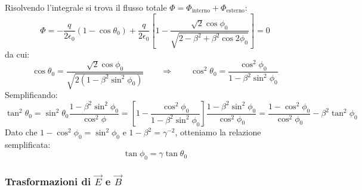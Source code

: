 \documentclass[]{article}
\begin{document}
Risolvendo l'integrale si trova il flusso totale $ \Phi = \Phi_{\text{interno}} + \Phi_{\text{esterno}} $:
\begin{equation}
	\Phi = -\frac{q}{2\epsilon_0} (1-\cos\theta_0) + \frac{q}{2\epsilon_0} \left[ 1 - \frac{\sqrt{2}\cos\phi_0}{\sqrt{2 - \beta^2 + \beta^2 \cos2\phi_0}} \right] = 0
	\label{eq:35}
\end{equation}
da cui:
\begin{equation}
	\cos\theta_0 = \frac{\sqrt{2}\cos\phi_0}{\sqrt{2(1 - \beta^2\sin^2\phi_0)}} \qquad\Longrightarrow\qquad \cos^2\theta_0 = \frac{\cos^2\phi_0}{1 - \beta^2\sin^2\phi_0}
	\label{eq:36}
\end{equation}
Semplificando:
\begin{equation}
	\tan^2\theta_0 = \sin^2\theta_0 \frac{1 - \beta^2\sin^2\phi_0}{\cos^2\phi} = \left[1 - \frac{\cos^2\phi_0}{1 - \beta^2\sin^2\phi_0} \right] \frac{1 - \beta^2\sin^2\phi_0}{\cos^2\phi_0} = \frac{1 - \cos^2\phi_0}{\cos^2\phi_0} - \beta^2\tan^2\phi_0
	\label{eq:37}
\end{equation}
Dato che $ 1 - \cos^2\phi_0 = \sin^2\phi_0 $ e $ 1 - \beta^2 = \gamma^{-2} $, otteniamo la relazione semplificata:
\begin{equation}
	\tan\phi_0 = \gamma\tan\theta_0
	\label{eq:38}
\end{equation}

\subsubsection{Trasformazioni di $ \vec{E} $ e $ \vec{B} $}
\end{document}
